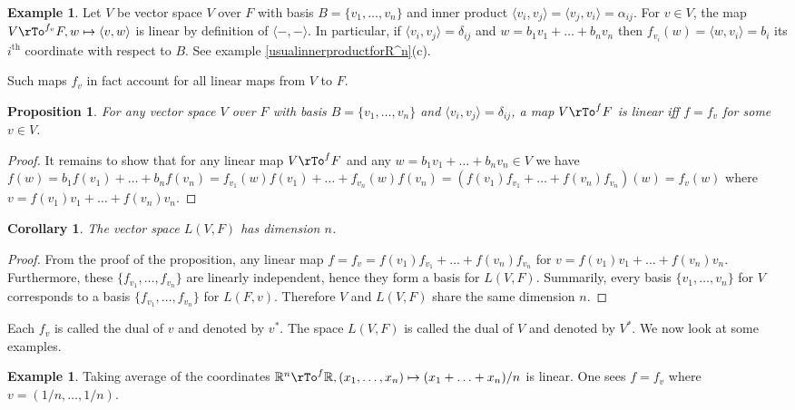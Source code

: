 \documentclass[12pt]{amsart}
\newtheorem{proposition}[theorem]{Proposition}
\newtheorem{corollary}[theorem]{Corollary}
\theoremstyle{definition}
\newtheorem{example}[theorem]{Example}
\begin{document}
\begin{example}\label{dualofvector} Let $V$ be vector space $V$ over $F$ with basis $B = \{v_1, \dots, v_n\}$ and inner product $\langle v_i, v_j \rangle = \langle v_j, v_i \rangle = \alpha_{ij}$. For $v \in V$, the map $V \rTo^{f_v} F, w \mapsto \langle v, w \rangle$ is linear by definition of $\langle - , - \rangle$. In particular, if $\langle v_i, v_j \rangle = \delta_{ij}$ and $w = b_1v_1 + \ldots + b_nv_n$ then $f_{v_i}(w) = \langle w, v_i \rangle = b_i$ its $i^{\text{th}}$ coordinate with respect to $B$. See example \ref{usualinnerproductforR^n}(c).
\end{example}

Such maps $f_v$ in fact account for all linear maps from $V$ to $F$.

\begin{proposition}\label{duality} For any vector space $V$ over $F$ with basis $B = \{v_1, \dots, v_n\}$ and $\langle v_i, v_j \rangle = \delta_{ij}$, a map $V \rTo^f F$ is linear iff $f = f_v$ for some $v \in V$.
\end{proposition}
\begin{proof} It remains to show that for any linear map $V \rTo^f F$ and any $w = b_1 v_1 + \ldots + b_n v_n \in V$ we have $f(w) = b_1f(v_1) + \ldots + b_nf(v_n) = f_{v_1}(w) f(v_1) + \ldots + f_{v_n}(w)f(v_n) = (f(v_1)f_{v_1} + \ldots + f(v_n)f_{v_n})(w) = f_v(w)$ where $v = f(v_1)v_1 + \ldots + f(v_n)v_n$.
\end{proof}

\begin{corollary}\label{dualspace} The vector space $L(V,F)$ has dimension $n$.
\end{corollary}
\begin{proof} From the proof of the proposition, any linear map $f = f_v = f(v_1)f_{v_1} + \ldots + f(v_n) f_{v_n}$ for $v = f(v_1)v_1 + \ldots + f(v_n)v_n$. Furthermore, these $\{f_{v_1}, \dots, f_{v_n}\}$ are linearly independent, hence they form a basis for $L(V,F)$. Summarily, every basis $\{v_1, \dots, v_n\}$ for $V$ corresponds to a basis $\{f_{v_1}, \dots, f_{v_n}\}$ for $L(F, v)$. Therefore $V$ and $L(V,F)$ share the same dimension $n$.
\end{proof}

Each $f_v$ is called the dual of $v$ and denoted by $v^*$. The space $L(V,F)$ is called the dual of $V$ and denoted by $V^*$. We now look at some examples.

\begin{example} Taking average of the coordinates $\mathbb{R}^n \rTo^f \mathbb{R}, (x_1, \dots, x_n) \mapsto (x_1 + \ldots + x_n)/n$ is linear. One sees $f = f_v$ where $v = (1/n, \dots, 1/n)$.
\end{example}
\end{document}
